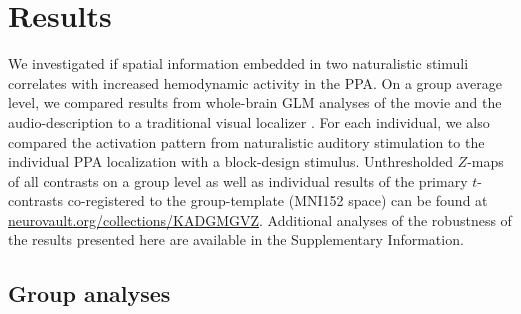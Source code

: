 \documentclass[english,11pt]{article}
\begin{document}


\section*{Results}


We investigated if spatial information embedded in two naturalistic stimuli
correlates with increased hemodynamic activity in the PPA.
On a group average level, we compared results from whole-brain GLM analyses of
the movie and the audio-description to a traditional visual localizer
\citep{sengupta2016extension}.
For each individual, we also compared the activation pattern from naturalistic
auditory stimulation to the individual PPA localization with a block-design
stimulus.
Unthresholded $Z$-maps of all contrasts on a group level as well as individual
results of the primary $t$-contrasts co-registered to the group-template (MNI152
space) can be found at
\href{https://neurovault.org/collections/KADGMGVZ/}{\url{neurovault.org/collections/KADGMGVZ}}.
Additional analyses of the robustness of the results presented here are
available in the Supplementary Information.


\subsection*{Group analyses}

\end{document}
